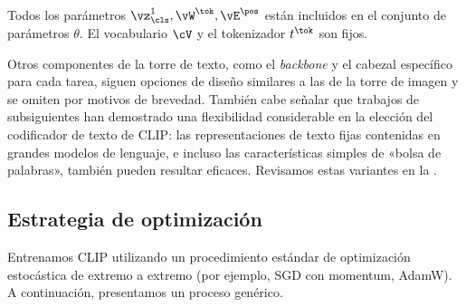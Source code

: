 \documentclass[../../book-main_es.tex]{subfiles}
\begin{document}
Todos los parámetros \(\vz_{\cls}^{1}, \vW^{\tok}, \vE^{\pos}\) están
incluidos en el conjunto de parámetros \(\theta\). El vocabulario \(\cV\) y el tokenizador \(t^{\tok}\) son fijos.

Otros componentes de la torre de texto, como el \textit{backbone} y el cabezal específico para cada 
tarea, siguen opciones de diseño similares a las de la torre de imagen y se omiten por motivos de 
brevedad. También cabe señalar que trabajos de subsiguientes han demostrado una flexibilidad considerable 
en la elección del codificador de texto de CLIP: las representaciones de texto fijas contenidas en 
grandes modelos de lenguaje, e incluso las características simples de «bolsa de palabras», también 
pueden resultar eficaces. Revisamos estas variantes en la .




\subsection{Estrategia de optimización}
Entrenamos CLIP utilizando un procedimiento estándar de optimización estocástica de extremo a extremo
(por ejemplo, SGD con momentum, AdamW). A continuación, presentamos un proceso genérico.
\end{document}
